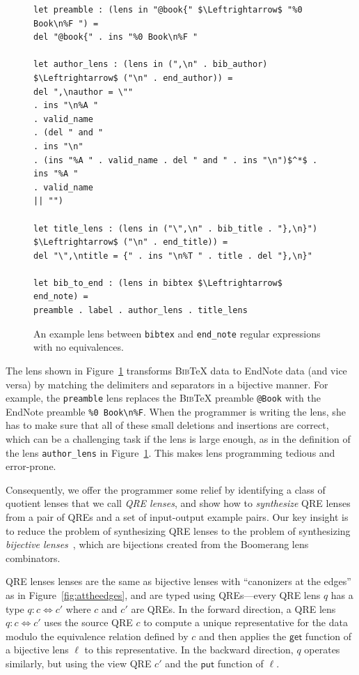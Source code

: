 \documentclass[acmsmall,review,anonymous]{acmart}\settopmatter{printfolios=true,printccs=false,printacmref=false}
\newcommand{\kw}[1]{\ensuremath{\mathsf{#1}}}
\newcommand{\bibtex}{\textsc{Bib}\TeX{}}
\newcommand{\get}{\ensuremath{\kw{get}}}
\newcommand{\lput}{\ensuremath{\kw{put}}}
\newcommand{\cd}[1]{\lstinline[backgroundcolor=\color{white}]$#1$}
\begin{document}
\begin{figure}[t]
\begin{lstlisting}
let preamble : (lens in "@book{" $\Leftrightarrow$ "%0 Book\n%F ") =
del "@book{" . ins "%0 Book\n%F "

let author_lens : (lens in (",\n" . bib_author) $\Leftrightarrow$ ("\n" . end_author)) =
del ",\nauthor = \""
. ins "\n%A "
. valid_name
. (del " and "
. ins "\n"
. (ins "%A " . valid_name . del " and " . ins "\n")$^*$ . ins "%A "
. valid_name
|| "")

let title_lens : (lens in ("\",\n" . bib_title . "},\n}") $\Leftrightarrow$ ("\n" . end_title)) =
del "\",\ntitle = {" . ins "\n%T " . title . del "},\n}"

let bib_to_end : (lens in bibtex $\Leftrightarrow$ end_note) =
preamble . label . author_lens . title_lens
\end{lstlisting}
\caption{An example lens between \cd{bibtex} and \cd{end_note} regular
expressions with no equivalences.}
\label{fig:example-lens}
\end{figure}

The lens shown in Figure~\ref{fig:example-lens} transforms \bibtex{} data to
EndNote data  (and vice versa) by matching the delimiters and separators in a
bijective manner. For example, the \cd{preamble} lens replaces the \bibtex{}
preamble \verb|@Book| with the EndNote preamble \verb|%0 Book\n%F|. When the
programmer is writing the lens, she has to make sure that all of these small
deletions and insertions are correct, which can be a challenging task if the
lens is large enough, as in the definition of the lens \verb!author_lens! in
Figure~\ref{fig:example-lens}. This makes lens programming tedious and
error-prone.

Consequently, we offer the programmer some relief by identifying a class of
quotient lenses that we call {\em QRE lenses}, and show how to {\em synthesize}
QRE lenses from a pair of QREs and a set of input-output example pairs. Our key
insight is to reduce the problem of synthesizing QRE lenses to the problem of
synthesizing {\em bijective lenses}~\cite{optician}, which are bijections created
from the Boomerang lens combinators.

QRE lenses lenses are the same as bijective lenses with ``canonizers at the
edges'' as in Figure~\ref{fig:attheedges}, and are typed using QREs---every QRE
lens $q$ has a type $q: c \Leftrightarrow c'$ where $c$ and $c'$ are QREs.
In the forward direction, a QRE lens $q: c \Leftrightarrow c'$ uses the source
QRE $c$ to compute a unique representative for the data modulo the equivalence
relation defined by $c$ and then applies the $\get$ function of a bijective
lens $\ell$ to this representative. In the backward direction, $q$ operates
similarly,  but using the view QRE $c'$ and the $\lput$ function of $\ell$.
\end{document}
